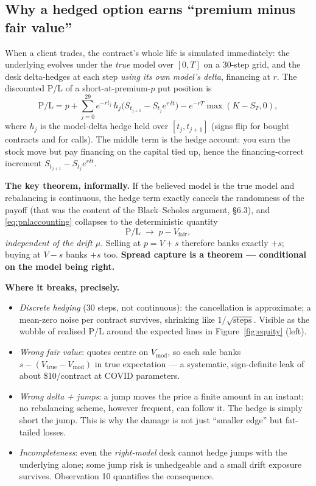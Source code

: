 \documentclass[11pt,a4paper]{article}
\begin{document}
\subsection{Why a hedged option earns ``premium minus fair value''}
\label{sec:hedgedpnl}
When a client trades, the contract's whole life is simulated immediately: the
underlying evolves under the \emph{true} model over $[0,T]$ on a 30-step grid,
and the desk delta-hedges at each step \emph{using its own model's delta},
financing at $r$. The discounted P/L of a short-at-premium-$p$ put position is
\begin{equation}
\text{P/L}=p
+\sum_{j=0}^{29}e^{-r t_j}\,h_j\big(S_{t_{j+1}}-S_{t_j}e^{r\,\delta t}\big)
-e^{-rT}\max(K-S_T,0),
\label{eq:pnlaccounting}
\end{equation}
where $h_j$ is the model-delta hedge held over $[t_j,t_{j+1}]$ (signs flip for
bought contracts and for calls). The middle term is the hedge account: you
earn the stock move but pay financing on the capital tied up, hence the
financing-correct increment $S_{t_{j+1}}-S_{t_j}e^{r\delta t}$.

\textbf{The key theorem, informally.} If the believed model is the true model
and rebalancing is continuous, the hedge term exactly cancels the randomness of
the payoff (that was the content of the Black--Scholes argument, \S6.3), and
\eqref{eq:pnlaccounting} collapses to the deterministic quantity
\begin{equation}
\text{P/L}\;\longrightarrow\;p-V_{\text{fair}} ,
\label{eq:hedgedlimit}
\end{equation}
\emph{independent of the drift $\mu$}. Selling at $p=V+s$ therefore banks
exactly $+s$; buying at $V-s$ banks $+s$ too. \textbf{Spread capture is a
theorem --- conditional on the model being right.}

\textbf{Where it breaks, precisely.}
\begin{itemize}[itemsep=2pt]
\item \emph{Discrete hedging} (30 steps, not continuous): the cancellation is
  approximate; a mean-zero noise per contract survives, shrinking like
  $1/\sqrt{\text{steps}}$. Visible as the wobble of realised P/L around the
  expected lines in Figure~\ref{fig:equity} (left).
\item \emph{Wrong fair value}: quotes centre on $V_{\text{mod}}$, so each sale
  banks $s-(V_{\text{true}}-V_{\text{mod}})$ in true expectation --- a
  systematic, sign-definite leak of about \$10/contract at COVID parameters.
\item \emph{Wrong delta + jumps}: a jump moves the price a finite amount in an
  instant; no rebalancing scheme, however frequent, can follow it. The hedge is
  simply short the jump. This is why the damage is not just ``smaller edge''
  but fat-tailed losses.
\item \emph{Incompleteness}: even the \emph{right-model} desk cannot hedge
  jumps with the underlying alone; some jump risk is unhedgeable and a small
  drift exposure survives. Observation 10 quantifies the consequence.
\end{itemize}
\end{document}

